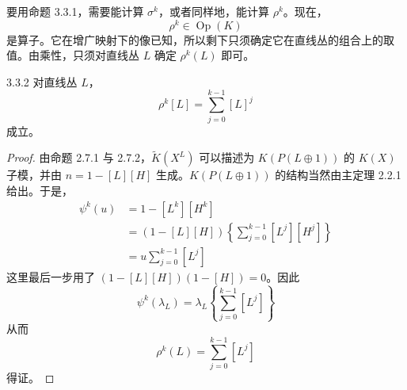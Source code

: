要用命题 3.3.1，需要能计算 $\sigma^k$，或者同样地，能计算 $\rho^k$。现在，
\begin{equation*}
  \rho^k\in\operatorname{Op}(K)
\end{equation*}
是算子。它在增广映射下的像已知，所以剩下只须确定它在直线丛的组合上的取值。由乘性，只须对直线丛 $L$ 确定 $\rho^k(L)$ 即可。

\begin{lemma*}{3.3.2}
  对直线丛 $L$，
  \begin{equation*}
    \rho^k[L]=\sum_{j=0}^{k-1}[L]^j
  \end{equation*}
  成立。
\end{lemma*}

\begin{proof}
由命题 2.7.1 与 2.7.2，$\tilde K(X^L)$ 可以描述为 $K(P(L\oplus1))$ 的 $K(X)$ 子模，并由 $n=1-[L][H]$ 生成。$K(P(L\oplus1))$ 的结构当然由主定理 2.2.1 给出。于是，
\begin{align*}
  \psi^k(u) &= 1-[L^k][H^k] \\
  &= (1-[L][H])\left\{\sum_{j=0}^{k-1}[L^j][H^j]\right\} \\
  &= u\sum_{j=0}^{k-1}[L^j]
\end{align*}
这里最后一步用了 $(1-[L][H])(1-[H])=0$。因此
\begin{equation*}
  \psi^k(\lambda_L)=\lambda_L\left\{\sum_{j=0}^{k-1}[L^j]\right\}
\end{equation*}
从而
\begin{equation*}
  \rho^k(L)=\sum_{j=0}^{k-1}[L^j]
\end{equation*}
得证。
\end{proof}

